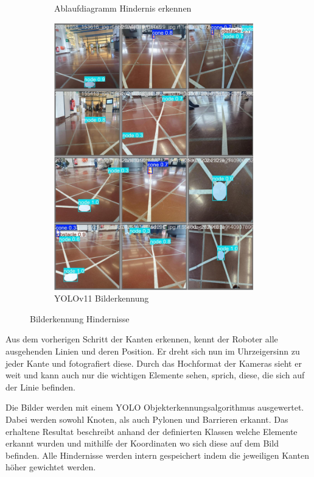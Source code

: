 \begin{figure}[H]
\begin{subfigure}{0.45\textwidth}
\caption{Ablaufdiagramm Hindernis erkennen}
\label{fig:ablaufdiagramm-hindernis-erkennen}
\end{subfigure}
\begin{subfigure}{0.5\textwidth}
\centering
\includegraphics[width=0.95\textwidth]{assets/informatik-prototyp/yolo/recognized-images.jpeg}
\caption{YOLOv11 Bilderkennung}
\label{fig:img-recognition-yolo-concept}
\end{subfigure}
\caption{Bilderkennung Hindernisse}
\label{fig:image-detection-obstacles}
\end{figure}

Aus dem vorherigen Schritt der Kanten erkennen, kennt der Roboter alle ausgehenden Linien und deren Position. Er dreht sich nun im Uhrzeigersinn zu jeder Kante und fotografiert diese. Durch das Hochformat der Kameras sieht er weit und kann auch nur die wichtigen Elemente sehen, sprich, diese, die sich auf der Linie befinden.

Die Bilder werden mit einem YOLO Objekterkennungsalgorithmus ausgewertet. Dabei werden sowohl Knoten, als auch Pylonen und Barrieren erkannt. Das erhaltene Resultat beschreibt anhand der definierten Klassen welche Elemente erkannt wurden und mithilfe der Koordinaten wo sich diese auf dem Bild befinden.
Alle Hindernisse werden intern gespeichert indem die jeweiligen Kanten höher gewichtet werden.


